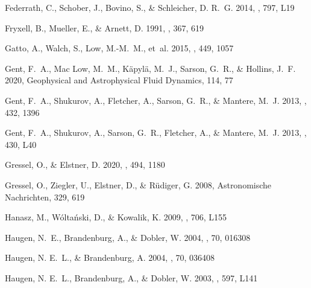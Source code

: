 \documentclass[preprint2]{aastex63}
\begin{document}
\begin{thebibliography}{}
{Federrath}, C., {Schober}, J., {Bovino}, S., \& {Schleicher}, D. R.~G. 2014,
 \apjl, 797, L19

{Fryxell}, B., {Mueller}, E., \& {Arnett}, D. 1991, \apj, 367, 619

{Gatto}, A., {Walch}, S., {Low}, M.-M.~M., {et~al.} 2015, \mnras, 449, 1057

{Gent}, F.~A., {Mac Low}, M.~M., {K{\"a}pyl{\"a}}, M.~J., {Sarson}, G.~R., \&
 {Hollins}, J.~F. 2020, Geophysical and Astrophysical Fluid Dynamics, 114, 77

{Gent}, F.~A., {Shukurov}, A., {Fletcher}, A., {Sarson}, G.~R., \& {Mantere},
 M.~J. 2013{}, \mnras, 432, 1396

{Gent}, F.~A., {Shukurov}, A., {Sarson}, G.~R., {Fletcher}, A., \& {Mantere},
 M.~J. 2013{}, \mnras, 430, L40

{Gressel}, O., \& {Elstner}, D. 2020, \mnras, 494, 1180

{Gressel}, O., {Ziegler}, U., {Elstner}, D., \& {R{\"u}diger}, G. 2008,
 Astronomische Nachrichten, 329, 619

{Hanasz}, M., {W{\'o}lta{\'n}ski}, D., \& {Kowalik}, K. 2009, \apjl, 706, L155

{Haugen}, N.~E., {Brandenburg}, A., \& {Dobler}, W. 2004{}, \pre,
 70, 016308

{Haugen}, N. E.~L., \& {Brandenburg}, A. 2004, \pre, 70, 036408

{Haugen}, N. E.~L., {Brandenburg}, A., \& {Dobler}, W. 2003, \apjl, 597, L141


\end{thebibliography}
\end{document}
